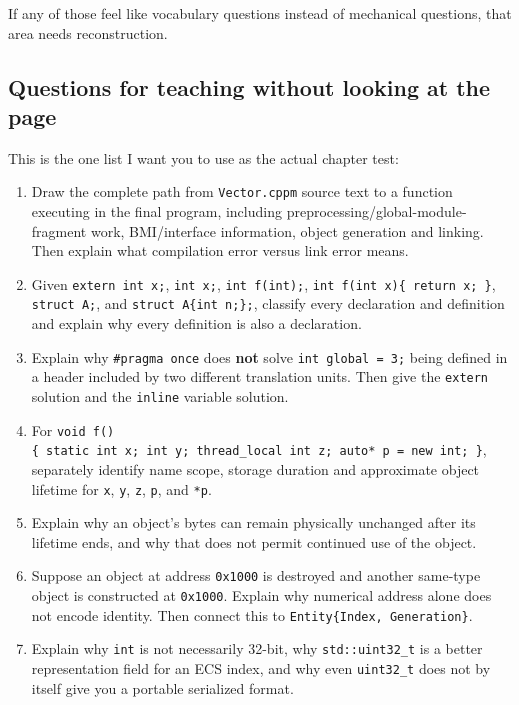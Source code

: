 If any of those feel like vocabulary questions instead of mechanical questions, that area needs reconstruction.

\subsection{Questions for teaching without looking at the page}\label{questions-for-teaching-without-looking-at-the-page}

This is the one list I want you to use as the actual chapter test:

\begin{enumerate}
\def\labelenumi{\arabic{enumi}.}
\item
  Draw the complete path from \texttt{Vector.cppm} source text to a function executing in the final program, including preprocessing/global-module-fragment work, BMI/interface information, object generation and linking. Then explain what compilation error versus link error means.
\item
  Given \texttt{extern\ int\ x;}, \texttt{int\ x;}, \texttt{int\ f(int);}, \texttt{int\ f(int\ x)\{\ return\ x;\ \}}, \texttt{struct\ A;}, and \texttt{struct\ A\{int\ n;\};}, classify every declaration and definition and explain why every definition is also a declaration.
\item
  Explain why \texttt{\#pragma\ once} does \textbf{not} solve \texttt{int\ global\ =\ 3;} being defined in a header included by two different translation units. Then give the \texttt{extern} solution and the \texttt{inline} variable solution.
\item
  For \texttt{void\ f()\{\ static\ int\ x;\ int\ y;\ thread\_local\ int\ z;\ auto*\ p\ =\ new\ int;\ \}}, separately identify name scope, storage duration and approximate object lifetime for \texttt{x}, \texttt{y}, \texttt{z}, \texttt{p}, and \texttt{*p}.
\item
  Explain why an object's bytes can remain physically unchanged after its lifetime ends, and why that does not permit continued use of the object.
\item
  Suppose an object at address \texttt{0x1000} is destroyed and another same-type object is constructed at \texttt{0x1000}. Explain why numerical address alone does not encode identity. Then connect this to \texttt{Entity\{Index,\ Generation\}}.
\item
  Explain why \texttt{int} is not necessarily 32-bit, why \texttt{std::uint32\_t} is a better representation field for an ECS index, and why even \texttt{uint32\_t} does not by itself give you a portable serialized format.

\end{enumerate}

